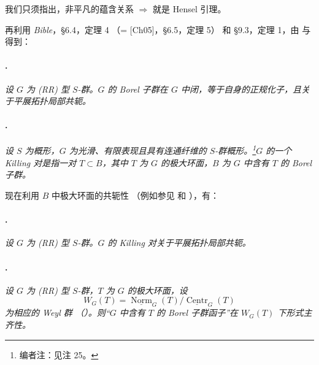 我们只须指出，非平凡的蕴含关系 \textup{}\(\Rightarrow\)\textup{} 就是 Hensel 引理。

再利用 \textit{Bible}，\S6.4，定理 4 \textup{（= [Ch05]，\S6.5，定理 5）} 和 \S9.3，定理 1，由  与  得到：

\paragraph{.}
\textit{设 \(G\) 为 \textup{(RR)} 型 \(S\)-群。\(G\) 的 Borel 子群在 \(G\) 中闭，等于自身的正规化子，且关于平展拓扑局部共轭。}

\paragraph{.}
\textit{设 \(S\) 为概形，\(G\) 为光滑、有限表现且具有连通纤维的 \(S\)-群概形。\footnote{编者注：见注 25。}\(G\) 的一个 \emph{Killing 对}是指一对 \(T\subset B\)，其中 \(T\) 为 \(G\) 的极大环面，\(B\) 为 \(G\) 中含有 \(T\) 的 Borel 子群。}

现在利用 \(B\) 中极大环面的共轭性 \textup{（例如参见  \textup{} 和 ）}，有：

\paragraph{.}
\textit{设 \(G\) 为 \textup{(RR)} 型 \(S\)-群。\(G\) 的 Killing 对关于平展拓扑局部共轭。}

\paragraph{.}
\textit{设 \(G\) 为 \textup{(RR)} 型 \(S\)-群，\(T\) 为 \(G\) 的极大环面，设}
\[
  W_G(T)
  =
  \underline{\operatorname{Norm}}_G(T)/
  \underline{\operatorname{Centr}}_G(T)
\]
\textit{为相应的 Weyl 群 \textup{（）}。则“\(G\) 中含有 \(T\) 的 Borel 子群函子”在 \(W_G(T)\) 下形式主齐性。}


